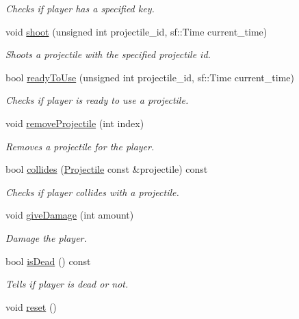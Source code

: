 \begin{DoxyCompactItemize}
\begin{DoxyCompactList}\small\item\em Checks if player has a specified key. \end{DoxyCompactList}\item 
void \hyperlink{classPlayer_a36adab5b0f1a273290786c75c280d69d}{shoot} (unsigned int projectile\+\_\+id, sf\+::\+Time current\+\_\+time)
\begin{DoxyCompactList}\small\item\em Shoots a projectile with the specified projectile id. \end{DoxyCompactList}\item 
bool \hyperlink{classPlayer_a1f5b4b98f1fa5fd8508cc2172f671b36}{ready\+To\+Use} (unsigned int projectile\+\_\+id, sf\+::\+Time current\+\_\+time)
\begin{DoxyCompactList}\small\item\em Checks if player is ready to use a projectile. \end{DoxyCompactList}\item 
void \hyperlink{classPlayer_a5fd87607be56c5175539f4e30ab09923}{remove\+Projectile} (int index)
\begin{DoxyCompactList}\small\item\em Removes a projectile for the player. \end{DoxyCompactList}\item 
bool \hyperlink{classPlayer_a5257af396fd0c0623fdf8baf0a9a634b}{collides} (\hyperlink{classProjectile}{Projectile} const \&projectile) const
\begin{DoxyCompactList}\small\item\em Checks if player collides with a projectile. \end{DoxyCompactList}\item 
void \hyperlink{classPlayer_acfc10fe38c7a5c41b201c2f29c23d544}{give\+Damage} (int amount)
\begin{DoxyCompactList}\small\item\em Damage the player. \end{DoxyCompactList}\item 
bool \hyperlink{classPlayer_a20665e4647baa8f898a62021e6204450}{is\+Dead} () const
\begin{DoxyCompactList}\small\item\em Tells if player is dead or not. \end{DoxyCompactList}\item 
void \hyperlink{classPlayer_a1af5d39f7bac2aeaa1e30c7dda2332fa}{reset} ()

\end{DoxyCompactItemize}
